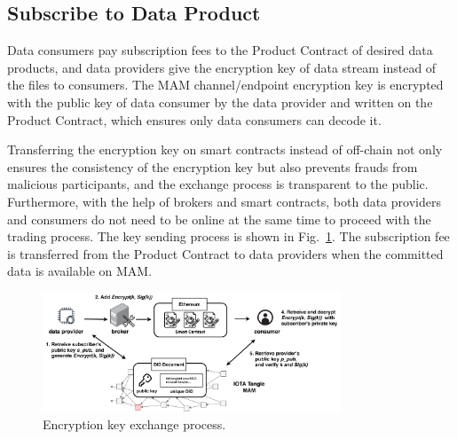 \documentclass[10pt, conference, compsocconf]{IEEEtran}
\begin{document}
\subsection{Subscribe to Data Product}
Data consumers pay subscription fees to the Product Contract of desired data products, and data providers give the encryption key of data stream instead of the files to consumers. The MAM channel/endpoint encryption key is encrypted with the public key of data consumer by the data provider and written on the Product Contract, which ensures only data consumers can decode it.

Transferring the encryption key on smart contracts instead of off-chain not only ensures the consistency of the encryption key but also prevents frauds from malicious participants, and the exchange process is transparent to the public. Furthermore, with the help of brokers and smart contracts, both data providers and consumers do not need to be online at the same time to proceed with the trading process. The key sending process is shown in Fig.~\ref{fig:key_exchange}. The subscription fee is transferred from the Product Contract to data providers when the committed data is available on MAM.

\begin{figure}[!t]
    \centering
    \includegraphics[width=3.5in]{key_exchange_reorganize}
    \caption{Encryption key exchange process.}
    \label{fig:key_exchange}
\end{figure}
\end{document}

